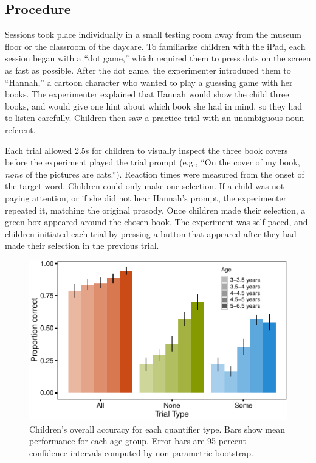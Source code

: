 \documentclass[10pt, letterpaper]{article}
\newenvironment{CodeChunk}{}{}
\begin{document}
\subsection{Procedure}\label{procedure}

Sessions took place individually in a small testing room away from the
museum floor or the classroom of the daycare. To familiarize children
with the iPad, each session began with a ``dot game,'' which required
them to press dots on the screen as fast as possible. After the dot
game, the experimenter introduced them to ``Hannah,'' a cartoon
character who wanted to play a guessing game with her books. The
experimenter explained that Hannah would show the child three books, and
would give one hint about which book she had in mind, so they had to
listen carefully. Children then saw a practice trial with an unambiguous
noun referent.

Each trial allowed 2.5s for children to visually inspect the three book
covers before the experiment played the trial prompt (e.g., ``On the
cover of my book, \emph{none} of the pictures are cats.''). Reaction
times were measured from the onset of the target word. Children could
only make one selection. If a child was not paying attention, or if she
did not hear Hannah's prompt, the experimenter repeated it, matching the
original prosody. Once children made their selection, a green box
appeared around the chosen book. The experiment was self-paced, and
children initiated each trial by pressing a button that appeared after
they had made their selection in the previous trial.

\begin{CodeChunk}
\begin{figure}[t]
\includegraphics{figs/overall_acc-1} \caption[Children's overall accuracy for each quantifier type]{Children's overall accuracy for each quantifier type. Bars show mean performance for each age group. Error bars are 95 percent confidence intervals computed by non-parametric bootstrap.}\label{fig:overall_acc}
\end{figure}
\end{CodeChunk}
\end{document}
